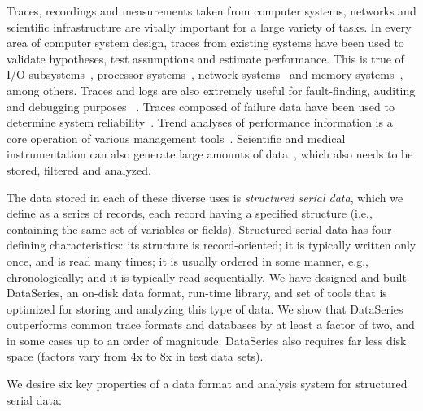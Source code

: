 \documentclass{acm_proc_article-sp}
\begin{document}
Traces, recordings and measurements taken from computer systems,
networks and scientific infrastructure are vitally important for a
large variety of tasks. In every area of computer system design,
traces from existing systems have been used to validate hypotheses,
test assumptions and estimate performance. This is true of I/O
subsystems~\cite{IORef,Ji03,Uysal03}, processor
systems~\cite{ProcRef}, network systems~\cite{NetRef} and memory
systems~\cite{MemRef}, among others. Traces and logs are also
extremely useful for fault-finding, auditing and debugging purposes
~\cite{DebugRef}. Traces composed of failure data have been used to
determine system reliability~\cite{ReliabilityRef, Schroeder07,
Pinheiro07}. Trend analyses of performance information is a core
operation of various management tools~\cite{MgmtRef}. Scientific and
medical instrumentation can also generate large amounts of
data~\cite{SciRef}, which also needs to be stored, filtered and
analyzed.

The data stored in each of these diverse uses is {\it structured
serial data}, which we define as a series of records, each record
having a specified structure (i.e., containing the same set of
variables or fields). Structured serial data has four defining characteristics:
its structure is record-oriented; it is typically written only once,
and is read many times; it is usually ordered
in some manner, e.g., chronologically; and it is typically read
sequentially.  We have designed and built DataSeries, an on-disk 
data format, run-time library, and set of
tools that is optimized for storing and analyzing this type of data.
We show that 
DataSeries outperforms
common trace formats and databases by at
least a factor of two, and in some cases up to an order of
magnitude. DataSeries also requires far less disk space (factors vary
from 4x to 8x in test data sets).


We desire six key properties of a data format and analysis system for
structured serial data:
\end{document}
